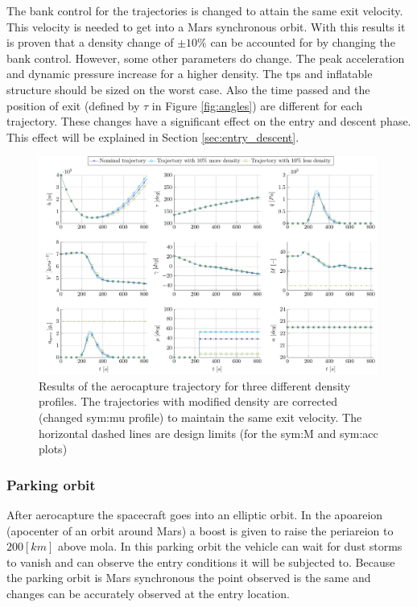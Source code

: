 The bank control for the trajectories is changed to attain the same exit velocity. This velocity is needed to get into a Mars synchronous orbit. With this results it is proven that a density change of $\pm 10\%$ can be accounted for by changing the bank control. However, some other parameters do change. The peak acceleration and dynamic pressure increase for a higher density. The \gls{tps} and inflatable structure should be sized on the worst case. Also the time passed and the position of exit (defined by $\tau$ in Figure \ref{fig:angles}) are different for each trajectory. These changes have a significant effect on the entry and descent phase. This effect will be explained in Section \ref{sec:entry_descent}.
\begin{figure}
	\centering
	\includegraphics[width=0.99\textwidth]{Figure/Orbit/sensitivity_aerocapture.pdf}
	\caption[Results of the aerocapture trajectory for three different density profiles]{Results of the aerocapture trajectory for three different density profiles. The trajectories with modified density are corrected (changed \gls{sym:mu} profile) to maintain the same exit velocity. The horizontal dashed lines are design limits (for the \gls{sym:M} and \gls{sym:acc} plots) }
	\label{fig:orbit_aerocapture_data}
\end{figure}

\subsubsection{Parking orbit}\label{sec:parking_orbit}
After aerocapture the spacecraft goes into an elliptic orbit. In the apoareion (apocenter of an orbit around Mars) a boost is given to raise the periareion to $200 \left[km\right]$ above \gls{mola}. In this parking orbit the vehicle can wait for dust storms to vanish and can observe the entry conditions it will be subjected to. Because the parking orbit is Mars synchronous the point observed is the same and changes can be accurately observed at the entry location. 

